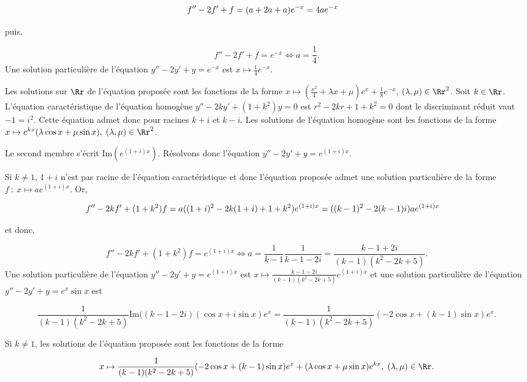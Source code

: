 {{\begin{align*}\ensuremath
f''-2f'+f&=(a+2a+a)e^{-x}=4ae^{-x}
\end{align*}

puis,

$$f''-2f'+f=e^{-x}\Leftrightarrow a=\frac{1}{4}.$$
Une solution particulière de l'équation $y''-2y'+y=e^{-x}$ est $x\mapsto\frac{1}{4}e^{-x}$.

Les solutions sur $\Rr$ de l'équation proposée sont les fonctions de la forme
$x\mapsto(\frac{x^2}{4}+\lambda x+\mu)e^x+\frac{1}{8}e^{-x}$, $(\lambda,\mu)\in\Rr^2$.
Soit $k\in\Rr$. L'équation caractéristique de l'équation homogène $y''-2ky'+(1+k^2)y=0$ est $r^2-2kr+1+k^2=0$
dont le discriminant réduit vaut $-1=i^2$. Cette équation admet donc pour racines $k+i$ et $k-i$. Les solutions de
l'équation homogène sont les fonctions de la forme $x\mapsto e^{kx}(\lambda\cos x+\mu\sin x),\;(\lambda,\mu)\in\Rr^2$.

Le second membre s'écrit $\mbox{Im}(e^{(1+i)x})$. Résolvons donc l'équation $y''-2y'+y=e^{(1+i)x}$.

Si $k\neq1$, $1+i$ n'est pas racine de l'équation caractéristique et donc
l'équation proposée admet une solution particulière de la forme $f~:~x\mapsto ae^{(1+i)x}$. Or,

\begin{align*}\ensuremath
f''-2kf'+(1+k^2)f&=a((1+i)^2-2k(1+i)+1+k^2)e^{(1+i)x}=((k-1)^2-2(k-1)i)ae^{(1+i)x}
\end{align*}

et donc,

$$f''-2kf'+(1+k^2)f=e^{(1+i)x}\Leftrightarrow a=\frac{1}{k-1}\frac{1}{k-1-2i}=\frac{k-1+2i}{(k-1)(k^2-2k+5)}.$$
Une solution particulière de l'équation $y''-2y'+y=e^{(1+i)x}$ est $x\mapsto\frac{k-1-2i}{(k-1)(k^2-2k+5)}e^{(1+i)x}$
et une solution particulière de l'équation $y''-2y'+y=e^{x}\sin x$ est

$$\frac{1}{(k-1)(k^2-2k+5)}\mbox{Im}((k-1-2i)(\cos x+i\sin x)e^x=\frac{1}{(k-1)(k^2-2k+5)}(-2\cos x+(k-1)\sin x)e^x.$$

Si $k\neq1$, les solutions de l'équation proposée sont les fonctions de la forme

$$x\mapsto\frac{1}{(k-1)(k^2-2k+5)}(-2\cos x+(k-1)\sin x)e^x+(\lambda\cos x+\mu\sin x)e^{kx},\;(\lambda,\mu)\in\Rr.$$
}
}
